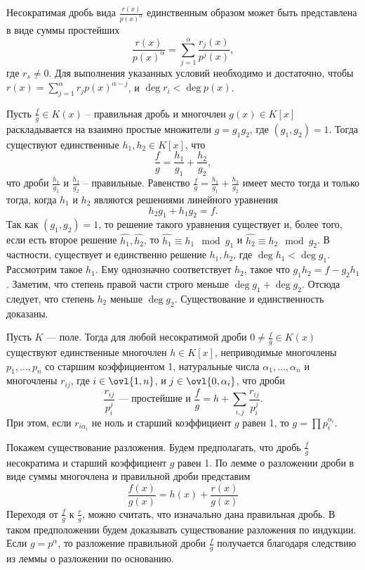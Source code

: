 \crl Несократимая дробь вида $\frac{r(x)}{p(x)^{\alpha}}$ единственным образом может быть представлена в виде суммы простейших
$$\frac{r(x)}{p(x)^{\alpha}}= \sum_{j=1}^{\alpha} \frac{r_j(x)}{p^j(x)},$$
где $r_s \neq 0$.
\proof Для выполнения указанных условий необходимо  и достаточно, чтобы $r(x)=\sum_{j=1}^{\alpha} r_j p(x)^{\alpha-j} $, и $\deg r_i < \deg p(x)$. 
\endproof
\ecrl


 Пусть $\frac{f}{g} \in K(x)$ -- правильная дробь и многочлен $g(x)\in K[x]$ раскладывается на взаимно простые множители $g=g_1g_2$, где $(g_1,g_2)=1$. Тогда существуют единственные $h_1,h_2 \in K[x]$, что $$\frac{f}{g}=\frac{h_1}{g_1}+\frac{h_2}{g_2},$$
что дроби $\frac{h_1}{g_1}$ и $\frac{h_2}{g_2}$ -- правильные.
\elm
\proof Равенство
$ \frac{f}{g}=\frac{h_1}{g_1}+\frac{h_2}{g_2}$
имеет место тогда и только тогда, когда $h_1$ и $h_2$ являются решениями линейного уравнения $$h_2g_1+h_1g_2=f.$$
Так как $(g_1,g_2)=1$, то решение такого уравнения существует и, более того, если есть второе решение $\hat{h_1}, \hat{h_2}$, то $\hat{h_1}\equiv h_1\mod g_1$ и $\hat{h_2}\equiv h_2 \mod g_2$. В частности, существует и единственно решение $h_1, h_2$, где $\deg h_1 < \deg g_1$. Рассмотрим такое $h_1$. Ему однозначно соответствует $h_2$, такое что $g_1h_2= f- g_2h_1$. Заметим, что степень правой части строго меньше  $\deg g_1+ \deg g_2$. Отсюда следует, что степень $h_2$ меньше $\deg g_2$. Существование и единственность доказаны.
\endproof


 Пусть $K$ ---  поле. Тогда для любой несократимой дроби $0
\neq \frac{f}{g} \in K(x)$ существуют единственные многочлен $h\in K[x]$, неприводимые многочлены $p_1, \dots, p_n$ со старшим коэффициентом 1, натуральные числа $\alpha_1,\dots, \alpha_n$ и многочлены $r_{ij}$, где $i\in \ovl{1,n}$, и $j\in \ovl{0,\alpha_i}$, что дроби
$$ \frac{r_{ij}}{p_i^{j}} \text{ --- простейшие и } \frac{f}{g}=h+\sum_{i,j} \frac{r_{ij}}{p_i^{j}}.$$
При этом, если  $r_{i\alpha_i}$ не ноль и старший коэффициент $g$  равен 1, то $g=\prod p_i^{\alpha_i}$.
\ethrm

\proof Покажем существование разложения. Будем предполагать, что дробь $\frac{f}{g}$ несократима и старший коэффициент $g$ равен 1. По лемме о разложении дроби в виде суммы многочлена и правильной дроби представим $$\frac{f(x)}{g(x)}= h(x)+\frac{r(x)}{g(x)}$$
Переходя от $\frac{f}{g}$ к $\frac{r}{g}$, можно считать, что изначально дана правильная дробь.
В таком предположении будем доказывать существование разложения по индукции. Если $g=p^{\alpha}$, то разложение правильной дроби $\frac{f}{g}$ получается благодаря следствию из леммы о разложении по основанию.


